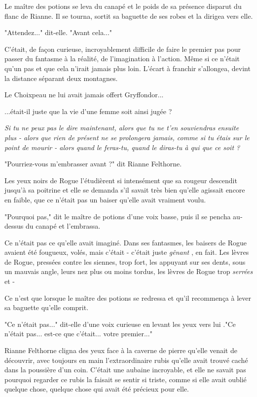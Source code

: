 Le maître des potions se leva du canapé et le poids de sa présence disparut du flanc de Rianne. Il se tourna, sortit sa baguette de ses robes et la dirigea vers elle.

"Attendez..." dit-elle. "Avant cela..."

C'était, de façon curieuse, incroyablement difficile de faire le premier pas pour passer du fantasme à la réalité, de l'imagination à l'action. Même si ce n'était qu'un pas et que cela n'irait jamais plus loin. L'écart à franchir s'allongea, devint la distance séparant deux montagnes.

Le Choixpeau ne lui avait jamais offert Gryffondor...

...était-il juste que la vie d'une femme soit ainsi jugée ?

\emph{Si tu ne peux pas le dire maintenant, alors que tu ne t'en souviendras ensuite plus - alors que rien de présent ne se prolongera jamais, comme si tu étais sur le point de mourir - alors quand le feras-tu, quand le diras-tu à qui que ce soit ?} 

"Pourriez-vous m'embrasser avant ?" dit Rianne Felthorne.

Les yeux noirs de Rogue l'étudièrent si intensément que sa rougeur descendit jusqu'à sa poitrine et elle se demanda s'il savait très bien qu'elle agissait encore en faible, que ce n'était pas un baiser qu'elle avait vraiment voulu.

"Pourquoi pas," dit le maître de potions d'une voix basse, puis il se pencha au-dessus du canapé et l'embrassa.

Ce n'était pas ce qu'elle avait imaginé. Dans ses fantasmes, les baisers de Rogue avaient été fougueux, volés, mais c'était - c'était juste \emph{gênant} , en fait. Les lèvres de Rogue, pressées contre les siennes, trop fort, les appuyant sur ses dents, sous un mauvais angle, leurs nez plus ou moins tordus, les lèvres de Rogue trop \emph{serrées}  et -

Ce n'est que lorsque le maître des potions se redressa et qu'il recommença à lever sa baguette qu'elle comprit.

"Ce n'était pas..." dit-elle d'une voix curieuse en levant les yeux vers lui ."Ce n'était pas... est-ce que c'était... votre premier..."

Rianne Felthorne cligna des yeux face à la caverne de pierre qu'elle venait de découvrir, avec toujours en main l'extraordinaire rubis qu'elle avait trouvé caché dans la poussière d'un coin. C'était une aubaine incroyable, et elle ne savait pas pourquoi regarder ce rubis la faisait se sentir si triste, comme si elle avait oublié quelque chose, quelque chose qui avait été précieux pour elle.

